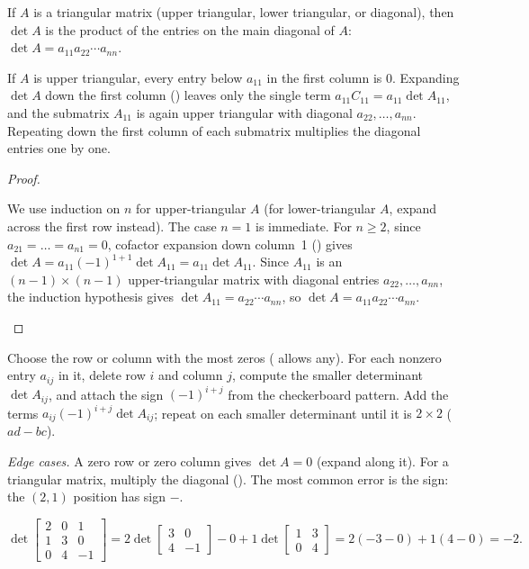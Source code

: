 \documentclass[10pt]{scrartcl}
\begin{document}
\begin{theorem*}
  If $A$ is a triangular matrix (upper triangular, lower triangular, or diagonal), then $\det A$ is the product of the entries on the main diagonal of $A$: $\det A = a_{11}a_{22}\cdots a_{nn}$.
\end{theorem*}
\begin{ideabox}
  If $A$ is upper triangular, every entry below $a_{11}$ in the first column is $0$. Expanding $\det A$ down the first column () leaves only the single term $a_{11}C_{11}=a_{11}\det A_{11}$, and the submatrix $A_{11}$ is again upper triangular with diagonal $a_{22},\dots,a_{nn}$. Repeating down the first column of each submatrix multiplies the diagonal entries one by one.
\end{ideabox}
\begin{proof}
  \begin{steps}
    \ii We use induction on $n$ for upper-triangular $A$ (for lower-triangular $A$, expand across the first row instead). The case $n=1$ is immediate.
    \ii For $n\ge 2$, since $a_{21}=\dots=a_{n1}=0$, cofactor expansion down column~1 () gives $\det A=a_{11}(-1)^{1+1}\det A_{11}=a_{11}\det A_{11}$.
    \ii Since $A_{11}$ is an $(n-1)\times(n-1)$ upper-triangular matrix with diagonal entries $a_{22},\dots,a_{nn}$, the induction hypothesis gives $\det A_{11}=a_{22}\cdots a_{nn}$, so $\det A=a_{11}a_{22}\cdots a_{nn}$.
  \end{steps}
\end{proof}

\begin{steps}
  \ii Choose the row or column with the most zeros ( allows any).
  \ii For each nonzero entry $a_{ij}$ in it, delete row $i$ and column $j$, compute the smaller determinant $\det A_{ij}$, and attach the sign $(-1)^{i+j}$ from the checkerboard pattern.
  \ii Add the terms $a_{ij}(-1)^{i+j}\det A_{ij}$; repeat on each smaller determinant until it is $2\times2$ ($ad-bc$).
\end{steps}
\emph{Edge cases.} A zero row or zero column gives $\det A=0$ (expand along it). For a triangular matrix, multiply the diagonal (). The most common error is the sign: the $(2,1)$ position has sign $-$.

\begin{example*}
\[
  \det\begin{bmatrix}2&0&1\\1&3&0\\0&4&-1\end{bmatrix}
  =2\det\begin{bmatrix}3&0\\4&-1\end{bmatrix}-0+1\det\begin{bmatrix}1&3\\0&4\end{bmatrix}
  =2(-3-0)+1(4-0)=-2.
\]
\end{example*}
\end{document}
